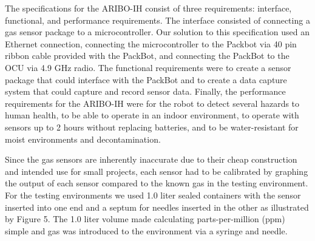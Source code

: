 The specifications for the ARIBO-IH consist of three requirements: interface, functional, and performance requirements. The interface consisted of connecting a gas sensor package to a microcontroller. Our solution to this specification used an Ethernet connection, connecting the microcontroller to the Packbot via 40 pin ribbon cable provided with the PackBot, and connecting the PackBot to the OCU via 4.9 GHz radio. The functional requirements were to create a sensor package that could interface with the PackBot and to create a data capture system that could capture and record sensor data. Finally, the performance requirements for the ARIBO-IH were for the robot to detect several hazards to human health, to be able to operate in an indoor environment, to operate with sensors up to 2 hours without replacing batteries, and to be water-resistant for moist environments and decontamination. 

Since the gas sensors are inherently inaccurate due to their cheap construction and intended use for small projects, each sensor had to be calibrated by graphing the output of each sensor compared to the known gas in the testing environment. For the testing environments we used 1.0 liter sealed containers with the sensor inserted into one end and a septum for needles inserted in the other as illustrated by Figure 5. The 1.0 liter volume made calculating parts-per-million (ppm) simple and gas was introduced to the environment via a syringe and needle.